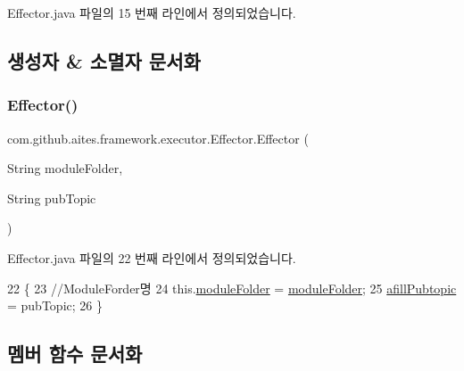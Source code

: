 Effector.\+java 파일의 15 번째 라인에서 정의되었습니다.



\subsection{생성자 \& 소멸자 문서화}
\mbox{\label{classcom_1_1github_1_1aites_1_1framework_1_1executor_1_1_effector_ad2c4c0921965aa0e0aa450e033b25706}} 
\subsubsection{\texorpdfstring{Effector()}{Effector()}}
{\footnotesize\ttfamily com.\+github.\+aites.\+framework.\+executor.\+Effector.\+Effector (\begin{DoxyParamCaption}\item[{String}]{module\+Folder,  }\item[{String}]{pub\+Topic }\end{DoxyParamCaption})}



Effector.\+java 파일의 22 번째 라인에서 정의되었습니다.


\begin{DoxyCode}
22                                                          \{
23         \textcolor{comment}{//ModuleForder명}
24         this.\mbox{\hyperlink{classcom_1_1github_1_1aites_1_1framework_1_1executor_1_1_effector_abd3712d877c8ff7227be30b6503f2475}{moduleFolder}} = \mbox{\hyperlink{classcom_1_1github_1_1aites_1_1framework_1_1executor_1_1_effector_abd3712d877c8ff7227be30b6503f2475}{moduleFolder}};
25         \mbox{\hyperlink{classcom_1_1github_1_1aites_1_1framework_1_1executor_1_1_effector_ada537f3c9fe303eb9503821843b08b30}{afillPubtopic}} = pubTopic;
26     \}
\end{DoxyCode}


\subsection{멤버 함수 문서화}
\mbox{\label{classcom_1_1github_1_1aites_1_1framework_1_1executor_1_1_effector_a2d1c773b1c83789a3ffb01cd32bfb276}} 
